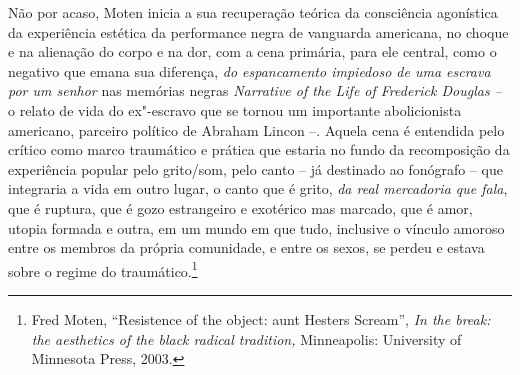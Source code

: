 Não por acaso, Moten inicia a sua recuperação teórica da consciência
agonística da experiência estética da performance negra de vanguarda
americana, no choque e na alienação do corpo e na dor, com a cena
primária, para ele central, como o negativo que emana sua diferença,
\emph{do espancamento impiedoso de uma escrava por um senhor} nas
memórias negras \emph{Narrative of the Life of Frederick Douglas --} o
relato de vida do ex"-escravo que se tornou um importante abolicionista
americano, parceiro político de Abraham Lincon --. Aquela cena é
entendida pelo crítico como marco traumático e prática que estaria no
fundo da recomposição da experiência popular pelo grito/som, pelo canto
-- já destinado ao fonógrafo -- que integraria a vida em outro lugar, o
canto que é grito, \emph{da real mercadoria que fala}, que é ruptura,
que é gozo estrangeiro e exotérico mas marcado, que é amor, utopia
formada e outra, em um mundo em que tudo, inclusive o vínculo amoroso
entre os membros da própria comunidade, e entre os sexos, se perdeu e
estava sobre o regime do traumático.\footnote{Fred Moten, ``Resistence of
  the object: aunt Hesters Scream'', \emph{In the break: the aesthetics
  of the black radical tradition,} Minneapolis: University of Minnesota
  Press, 2003.}


